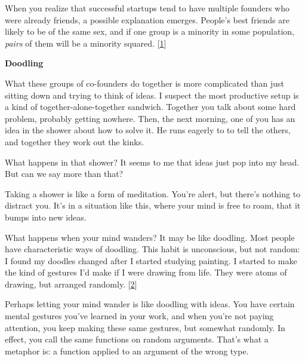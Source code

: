 When you realize that successful
                    startups tend to have multiple founders who were already
                    friends, a possible explanation emerges. People's best
                    friends are likely to be of the same sex, and if one group
                    is a minority in some population, \emph{pairs} of them will
                    be a minority squared.
                    [\href{\#f1n}{1}]

\textbf{Doodling}

What these groups of
                    co-founders do together is more complicated than just
                    sitting down and trying to think of ideas. I suspect the
                    most productive setup is a kind of together-alone-together
                    sandwich. Together you talk about some hard problem,
                    probably getting nowhere. Then, the next morning, one of you
                    has an idea in the shower about how to solve it. He runs
                    eagerly to to tell the others, and together they work out
                    the kinks.

What happens in that shower? It seems
                    to me that ideas just pop into my head. But can we say more
                    than that?

Taking a shower is like a form of
                    meditation. You're alert, but there's nothing to distract
                    you. It's in a situation like this, where your mind is free
                    to roam, that it bumps into new ideas.

What
                    happens when your mind wanders? It may be like doodling.
                    Most people have characteristic ways of doodling. This habit
                    is unconscious, but not random: I found my doodles changed
                    after I started studying painting. I started to make the
                    kind of gestures I'd make if I were drawing from life. They
                    were atoms of drawing, but arranged randomly.
                    [\href{\#f2n}{2}]

Perhaps letting your mind wander is like
                    doodling with ideas. You have certain mental gestures you've
                    learned in your work, and when you're not paying attention,
                    you keep making these same gestures, but somewhat randomly.
                    In effect, you call the same functions on random arguments.
                    That's what a metaphor is: a function applied to an argument
                    of the wrong type.

